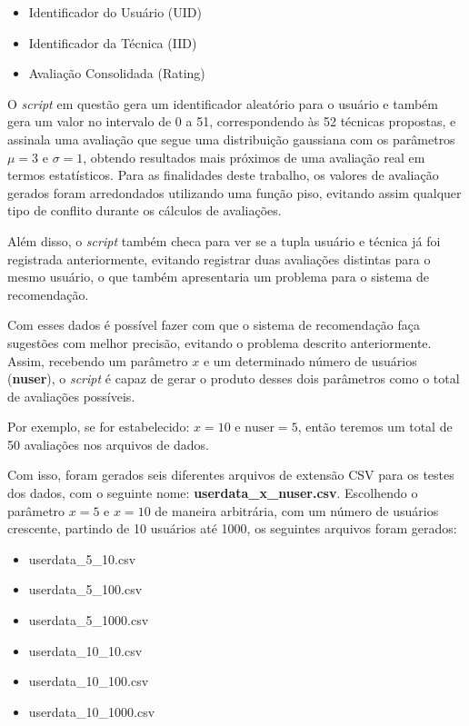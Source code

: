 \documentclass[
	12pt,				%
	oneside,			%
	a4paper,			%
	chapter=TITLE,		%
	english,			%
	french,				%
	spanish,			%
	brazil				%
	]{abntex2}
\begin{document}
\begin{itemize}
    \item Identificador do Usuário (UID)
    \item Identificador da Técnica (IID)
    \item Avaliação Consolidada (Rating)
\end{itemize}

O \emph{script} em questão gera um identificador aleatório para o usuário e também gera um valor no intervalo de 0 a 51, correspondendo às 52 técnicas propostas, e assinala uma avaliação que segue uma distribuição gaussiana com os parâmetros $\mu = 3$ e $\sigma = 1$, obtendo resultados mais próximos de uma avaliação real em termos estatísticos. Para as finalidades deste trabalho, os valores de avaliação gerados foram arredondados utilizando uma função piso, evitando assim qualquer tipo de conflito durante os cálculos de avaliações.

Além disso, o \emph{script} também checa para ver se a tupla usuário e técnica já foi registrada anteriormente, evitando registrar duas avaliações distintas para o mesmo usuário, o que também apresentaria um problema para o sistema de recomendação.

Com esses dados é possível fazer com que o sistema de recomendação faça sugestões com melhor precisão, evitando o problema descrito anteriormente. Assim, recebendo um parâmetro $x$ e um determinado número de usuários (\textbf{nuser}), o \emph{script} é capaz de gerar o produto desses dois parâmetros como o total de avaliações possíveis.

Por exemplo, se for estabelecido: $x = 10$ e $\text{nuser}=5$, então teremos um total de 50 avaliações nos arquivos de dados.

Com isso, foram gerados seis diferentes arquivos de extensão CSV para os testes dos dados, com o seguinte nome: \textbf{userdata\_x\_nuser.csv}. Escolhendo o parâmetro $x = 5$ e $x=10$ de maneira arbitrária, com um número de usuários crescente, partindo de 10 usuários até 1000, os seguintes arquivos foram gerados:

\begin{itemize}
    \item userdata\_5\_10.csv
    \item userdata\_5\_100.csv
    \item userdata\_5\_1000.csv
    \item userdata\_10\_10.csv
    \item userdata\_10\_100.csv
    \item userdata\_10\_1000.csv
\end{itemize}
\end{document}
